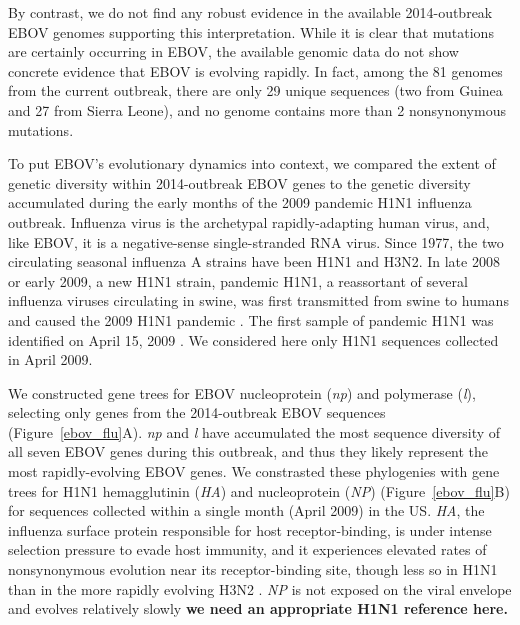 \documentclass[11pt]{article}
\begin{document}
By contrast, we do not find any robust evidence in the available 2014-outbreak EBOV genomes supporting this interpretation. While it is clear that mutations are certainly occurring in EBOV, the available genomic data do not show concrete evidence that EBOV is evolving rapidly. In fact, among the 81 genomes from the current outbreak, there are only 29 unique sequences (two from Guinea and 27 from Sierra Leone), and no genome contains more than 2 nonsynonymous mutations.

To put EBOV's evolutionary dynamics into context, we compared the extent of genetic diversity within 2014-outbreak EBOV genes to the genetic diversity accumulated during the early months of the 2009 pandemic H1N1 influenza outbreak. Influenza virus is the archetypal rapidly-adapting human virus, and, like EBOV, it is a negative-sense single-stranded RNA virus. Since 1977, the two circulating seasonal influenza A strains have been H1N1 and H3N2. In late 2008 or early 2009, a new H1N1 strain, pandemic H1N1, a reassortant of several influenza viruses circulating in swine, was first transmitted from swine to humans and caused the 2009 H1N1 pandemic \cite{Smithetal2009}. The first sample of pandemic H1N1 was identified on April 15, 2009 \citep{Neumannetal2009}. We considered here only H1N1 sequences collected in April 2009. 

We constructed gene trees for EBOV nucleoprotein (\emph{np}) and polymerase (\emph{l}), selecting only genes from the 2014-outbreak EBOV sequences (Figure~\ref{ebov_flu}A). \emph{np} and \emph{l} have accumulated the most sequence diversity of all seven EBOV genes during this outbreak, and thus they likely represent the most rapidly-evolving EBOV genes. We constrasted these phylogenies with gene trees for H1N1 hemagglutinin (\emph{HA}) and nucleoprotein (\emph{NP}) (Figure~\ref{ebov_flu}B) for sequences collected within a single month (April 2009) in the US. {\color{blue}\emph{HA}, the influenza surface protein responsible for host receptor-binding, is under intense selection pressure to evade host immunity, and it experiences elevated rates of nonsynonymous evolution near its receptor-binding site, though less so in H1N1 than in the more rapidly evolving H3N2 \citep{Meyer2012}. \emph{NP} is not exposed on the viral envelope and evolves relatively slowly \textbf{we need an appropriate H1N1 reference here.}
}
\end{document}
